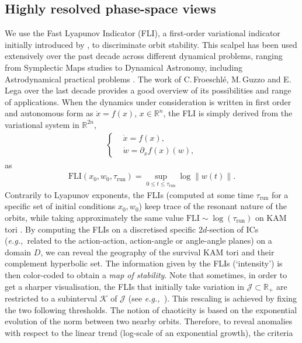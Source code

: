 \documentclass{amsart}
\theoremstyle{definition}
\theoremstyle{remark}
\numberwithin{equation}{section}
\newcommand{\norm}[1]{\left\lVert#1\right\rVert}
\newcommand{\eg}{\textit{e.g.,\ }}
\begin{document}
\subsection{Highly resolved phase-space views}\label{subsec:PSV}
 {\color{black}We use the Fast Lyapunov Indicator (FLI)}, a first-order variational indicator initially introduced by {\color{black}\cite{cFr97}}, to discriminate orbit stability. This scalpel has been used extensively over the past decade across 
different dynamical problems, ranging from Symplectic Maps studies to Dynamical Astronomy, including Astrodynamical practical problems \citep{cFr00,nTo15,nGu17,aRo17}. The work of C.\,Froeschl\'e, M.\,Guzzo and E.\,Lega over the last decade provides a good overview of its possibilities and range of applications. When the dynamics under consideration is  written in first order and autonomous form as $\dot{x}=f(x)$, $x \in \mathbb{R}^{n}$, the FLI is simply derived from the variational system  in  $\mathbb{R}^{2n}$,
\begin{align}
\left\{
 \begin{aligned}
 	&\dot{x} = f(x), \\
	&\dot{w} = \partial_{x}f(x)(w),
 \end{aligned}
 \right.
 \end{align}
 as
 \begin{align}
	\textrm{FLI}(x_{0},w_{0},\tau_{\textrm{run}}) = \sup_{0 \le t \le \tau_{\textrm{run}}} \log \norm{w(t)}.
\end{align}
Contrarily to Lyapunov exponents, the FLIs (computed at some time $\tau_{\textrm{run}}$ for a specific set of initial conditions  $x_{0},w_{0}$) keep trace of the resonant nature of the orbits, while taking approximately the same value 
$\textrm{FLI} \sim \log(\tau_{\textrm{run}})$ on KAM tori \citep{cFr00,mGu02}. 
By computing the FLIs on a discretised  specific $2d$-section  of ICs (\eg related to the action-action, action-angle or angle-angle planes) on a domain $D$, we can reveal the geography of the survival KAM tori and their complement hyperbolic set. The information given by the FLIs (`intensity') is then color-coded to obtain a \textit{map of stability}. Note that sometimes, in order to get a sharper visualisation, the FLIs {\color{black}that} initially take variation in $\mathcal{J}\subset \mathbb{R}_{+}$ are restricted to a subinterval $\mathcal{K}$ of $\mathcal{J}$ (see \eg \cite{eLe03,riPa15}). This rescaling is achieved by fixing the two following thresholds. 
The notion of chaoticity is based on the exponential evolution of the norm between two nearby orbits. Therefore, to reveal anomalies with respect to the linear trend (log-scale of an exponential growth), the criteria 
\end{document}
